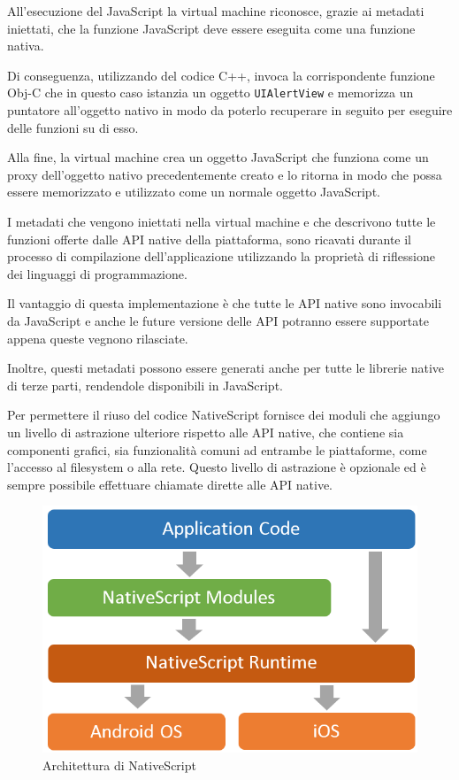All'esecuzione del JavaScript la virtual machine riconosce, grazie ai metadati iniettati, che la funzione JavaScript deve essere eseguita come una funzione nativa.

Di conseguenza, utilizzando del codice C++, invoca la corrispondente funzione Obj-C che in questo caso istanzia un oggetto \texttt{UIAlertView} e memorizza un puntatore all'oggetto nativo in modo da poterlo recuperare in seguito per eseguire delle funzioni su di esso.

Alla fine, la virtual machine crea un oggetto JavaScript che funziona come un proxy dell'oggetto nativo precedentemente creato e lo ritorna in modo che possa essere memorizzato e utilizzato come un normale oggetto JavaScript.

I metadati che vengono iniettati nella virtual machine e che descrivono tutte le funzioni offerte dalle API native della piattaforma, sono ricavati durante il processo di compilazione dell'applicazione utilizzando la proprietà di \gls{riflessione} dei linguaggi di programmazione.

Il vantaggio di questa implementazione è che tutte le API native sono invocabili da JavaScript e anche le future versione delle API potranno essere supportate appena queste vegnono rilasciate.

Inoltre, questi metadati possono essere generati anche per tutte le librerie native di terze parti, rendendole disponibili in JavaScript.

Per permettere il riuso del codice NativeScript fornisce dei moduli che aggiungo un livello di astrazione ulteriore rispetto alle API native, che contiene sia componenti grafici, sia funzionalità comuni ad entrambe le piattaforme, come l'accesso al filesystem o alla rete.
Questo livello di astrazione è opzionale ed è sempre possibile effettuare chiamate dirette alle API native.

\begin{figure}[htp]
\centering
\includegraphics[width=\textwidth/2]{../immagini/ns-architecture}
\caption{Architettura di NativeScript}  
\end{figure}
\FloatBarrier

